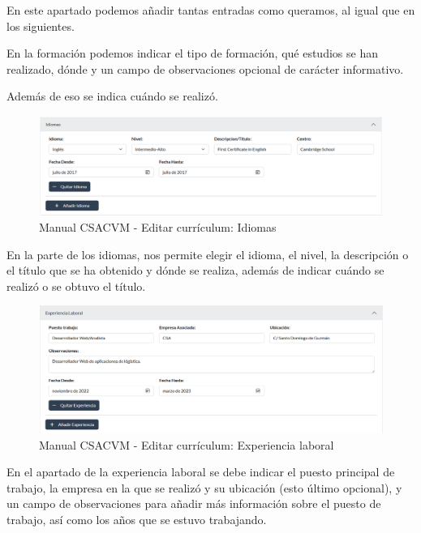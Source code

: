 En este apartado podemos añadir tantas entradas como queramos, al igual que en los siguientes. 

En la formación podemos indicar el tipo de formación, qué estudios se han realizado, dónde y un campo de observaciones opcional de carácter informativo. 

Además de eso se indica cuándo se realizó.

\begin{figure}
    \centering
    \includegraphics[width=\linewidth]{img/ManualUsuario/Manual14.png}
    \caption{Manual CSACVM - Editar currículum: Idiomas} 
\end{figure}
En la parte de los idiomas, nos permite elegir el idioma, el nivel, la descripción o el título que se ha obtenido y dónde se realiza, además de indicar cuándo se realizó o se obtuvo el título.

\begin{figure}
    \centering
    \includegraphics[width=\linewidth]{img/ManualUsuario/Manual15.png}
    \caption{Manual CSACVM - Editar currículum: Experiencia laboral}
\end{figure}
En el apartado de la experiencia laboral se debe indicar el puesto principal de trabajo, la empresa en la que se realizó y su ubicación (esto último opcional), y un campo de observaciones para añadir más información sobre el puesto de trabajo, así como los años que se estuvo trabajando.

